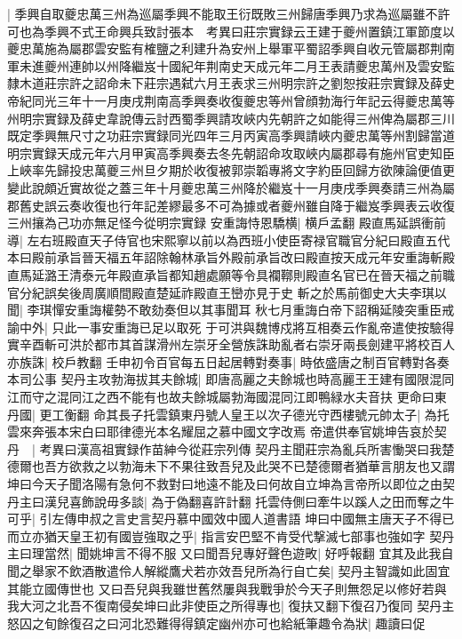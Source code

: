 |{
	季興自取夔忠萬三州為巡屬季興不能取王衍既敗三州歸唐季興乃求為巡屬雖不許可也為季興不式王命興兵致討張本　考異曰莊宗實録云王建于夔州置鎮江軍節度以夔忠萬施為屬郡雲安監有榷鹽之利建升為安州上舉軍平蜀詔季興自收元管屬郡荆南軍未進夔州連帥以州降繼岌十國紀年荆南史天成元年二月王表請夔忠萬州及雲安監隸木道莊宗許之詔命未下莊宗遇弑六月王表求三州明宗許之劉恕按莊宗實録及薛史帝紀同光三年十一月庚戌荆南高季興奏收復夔忠等州曾顔勃海行年記云得夔忠萬等州明宗實録及薛史韋說傳云討西蜀季興請攻峽内先朝許之如能得三州俾為屬郡三川既定季興無尺寸之功莊宗實録同光四年三月丙寅高季興請峽内夔忠萬等州割歸當道明宗實録天成元年六月甲寅高季興奏去冬先朝詔命攻取峽内屬郡尋有施州官吏知臣上峽率先歸投忠萬夔三州旦夕期於收復被郭崇韜專將文字約臣回歸方欲陳論便值更變此說頗近實故從之蓋三年十月夔忠萬三州降於繼岌十一月庚戌季興奏請三州為屬郡舊史誤云奏收復也行年記差繆最多不可為據或者夔州雖自降于繼岌季興表云收復三州攘為己功亦無足怪今從明宗實録}
安重誨恃恩驕横|{
	横戶孟翻}
殿直馬延誤衝前導|{
	左右班殿直天子侍官也宋熙寧以前以為西班小使臣寄禄官職官分紀曰殿直五代本曰殿前承旨晉天福五年詔除翰林承旨外殿前承旨改曰殿直按天成元年安重誨斬殿直馬延潞王清泰元年殿直承旨都知趙處願等令具襴鞹則殿直名官已在晉天福之前職官分紀誤矣後周廣順間殿直楚延祚殿直王巒亦見于史}
斬之於馬前御史大夫李琪以聞|{
	李琪憚安重誨權勢不敢劾奏但以其事聞耳}
秋七月重誨白帝下詔稱延陵突重臣戒諭中外|{
	只此一事安重誨已足以取死}
于可洪與魏博戍將互相奏云作亂帝遣使按驗得實辛酉斬可洪於都市其首謀滑州左崇牙全營族誅助亂者右崇牙兩長劍建平將校百人亦族誅|{
	校戶教翻}
壬申初令百官每五日起居轉對奏事|{
	時依盛唐之制百官轉對各奏本司公事}
契丹主攻勃海拔其夫餘城|{
	即唐高麗之夫餘城也時高麗王王建有國限混同江而守之混同江之西不能有也故夫餘城屬勃海國混同江即鴨緑水夫音扶}
更命曰東丹國|{
	更工衡翻}
命其長子托雲鎮東丹號人皇王以次子德光守西樓號元帥太子|{
	為托雲來奔張本宋白曰耶律德光本名耀屈之慕中國文字改焉}
帝遣供奉官姚坤告哀於契丹　|{
	考異曰漢高祖實録作苗紳今從莊宗列傳}
契丹主聞莊宗為亂兵所害慟哭曰我楚德爾也吾方欲救之以勃海未下不果往致吾兒及此哭不已楚德爾者猶華言朋友也又謂坤曰今天子聞洛陽有急何不救對曰地遠不能及曰何故自立坤為言帝所以即位之由契丹主曰漢兒喜飾說毋多談|{
	為于偽翻喜許計翻}
托雲侍側曰牽牛以蹊人之田而奪之牛可乎|{
	引左傳申叔之言史言契丹慕中國效中國人道書語}
坤曰中國無主唐天子不得已而立亦猶天皇王初有國豈強取之乎|{
	指言安巴堅不肯受代撃滅七部事也強如字}
契丹主曰理當然|{
	聞姚坤言不得不服}
又曰聞吾兒專好聲色遊畋|{
	好呼報翻}
宜其及此我自聞之舉家不飲酒散遣伶人解縱鷹犬若亦效吾兒所為行自亡矣|{
	契丹主智識如此固宜其能立國傳世也}
又曰吾兒與我雖世舊然屢與我戰爭於今天子則無怨足以修好若與我大河之北吾不復南侵矣坤曰此非使臣之所得專也|{
	復扶又翻下復召乃復同}
契丹主怒囚之旬餘復召之曰河北恐難得得鎮定幽州亦可也給紙筆趣令為狀|{
	趣讀曰促}
